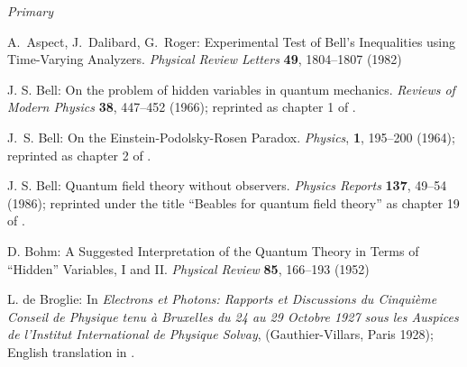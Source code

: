 \documentclass[12pt]{report}
\begin{document}
\begin{thebibliography}{100}

\item[\it Primary]

 A.~Aspect, J.~Dalibard, G.~Roger:
    Experimental Test of Bell's Inequalities using Time-Varying
    Analyzers. \textit{Physical Review  Letters} \textbf{49}, 1804--1807
    (1982)

 J. S. Bell: On the problem of hidden variables in
  quantum mechanics. \textit{Reviews of Modern Physics} \textbf{38}, 447--452
  (1966); reprinted as chapter 1 of \cite{Bell87b}.

 J.~S. Bell: On the
    Einstein-Podolsky-Rosen Paradox.  \textit{Physics},
    \textbf{1}, 195--200 (1964); reprinted as chapter 2 of \cite{Bell87b}.
    
 J. S. Bell: Quantum field theory without observers.
  \textit{Physics Reports} \textbf{137}, 49--54 (1986); reprinted 
  under the title ``Beables for quantum field theory'' as
  chapter 19 of \cite{Bell87b}.



 D. Bohm: A Suggested Interpretation of the Quantum
  Theory in Terms of ``Hidden'' Variables, I and II. \textit{Physical
    Review} \textbf{85}, 166--193 (1952)



 L. de Broglie: 
	In %
  {\em Electrons et Photons: Rapports et Discussions du Cinqui\`eme
    Conseil de Physique tenu \`a Bruxelles du 24 au 29 Octobre 1927
    sous les Auspices de l'Institut International de Physique Solvay},
  (Gauthier-Villars, Paris 1928); English translation in \cite{BV}.
  

\end{thebibliography}
\end{document}

